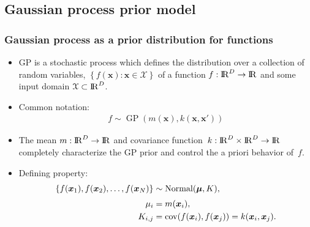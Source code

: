 \documentclass[8pt]{beamer} %
\DeclareMathOperator{\cov}{cov}
\DeclareMathOperator{\Normal}{Normal}
\DeclareMathOperator{\GP}{GP}
\begin{document}
\subsection*{Gaussian process prior model}
\begin{frame}
\frametitle{\normalsize Gaussian process as a prior distribution for functions}

\begin{itemize}\setlength\itemsep{2.5mm}
\item GP is a {\color{navyblue} stochastic process} which defines the distribution over a collection of random variables, $\left\lbrace  f(\bm{x}): \bm{x} \in \mathcal{X}\right\rbrace$ of a function $f:{\rm I\!R}^D \to {\rm I\!R}$ and some input domain $\mathcal{X} \subset {\rm I\!R}^D$.
%
\item Common notation:
%
\begin{align*}
f \sim \GP(m(\bm{x}), k(\bm{x}, \bm{x}'))
\end{align*}
%
\item The {\color{navyblue}mean} $m: {\rm I\!R}^D \to {\rm I\!R}$ and {\color{navyblue}covariance function}\, $k: {\rm I\!R}^D \times {\rm I\!R}^D \to {\rm I\!R}$ completely characterize the GP prior and control the a priori behavior of\, $f$.

\item Defining property: 
\vspace{-1mm}
%
\begin{align*}
\left\lbrace  f(\bm{x}_1), f(\bm{x}_2), \hdots, f(\bm{x}_N) \right\rbrace &\sim \Normal(\bm{\mu}, K),\\[1mm]
\mu_i &= m(\bm{x}_i),\\
\hspace{27mm} K_{i,j} &=\cov( f(\bm{x}_i),f(\bm{x}_j))=k(\bm{x}_i,\bm{x}_j).
\end{align*}
\end{itemize}
\end{frame}
\end{document}
